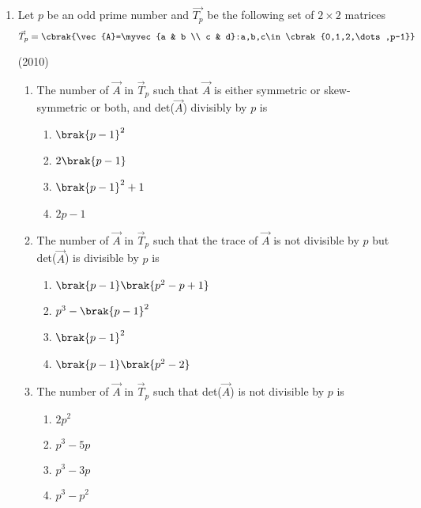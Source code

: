 \begin{enumerate}[label=\thesubsection.\arabic*.,ref=\thesubsection.\theenumi]


	\item Let $p$ be an odd prime number and $\vec{T_p}$ be the following set of $2\times2$ matrices 
	$$\vec{T}_p=\cbrak{\vec{A}=\myvec{a & b \\ c & d}:a,b,c\in\cbrak{0,1,2,\dots,p-1}}$$

			\hfill(2010)
	\begin{enumerate}
		\item The number of $\vec{A}$ in $\vec{T}_p$ such that $\vec{A}$ is either symmetric or skew-symmetric or both, and det($\vec{A}$) divisibly by $p$ is
\begin{multicols}{4}
			\begin{enumerate}
				\item $\brak{p-1}^2$
				\item $2\brak{p-1}$
				\item $\brak{p-1}^2+1$
				\item $2p-1$
			\end{enumerate}
\end{multicols}


		\item The number of $\vec{A}$ in $\vec{T}_p$ such that the trace of $\vec{A}$ is not divisible by $p$ but det($\vec{A}$) is divisible by $p$ is

\begin{multicols}{4}
			\begin{enumerate}
				\item $\brak{p-1}\brak{p^2-p+1}$
				\item $p^3-\brak{p-1}^2$
				\item $\brak{p-1}^2$
				\item $\brak{p-1}\brak{p^2-2}$
			\end{enumerate}
\end{multicols}
%
		\item The number of $\vec{A}$ in $\vec{T}_p$ such that det($\vec{A}$) is not divisible by $p$ is 
\begin{multicols}{4}
			\begin{enumerate}
				\item $2p^2$
				\item $p^3-5p$
				\item $p^3-3p$
				\item $p^3-p^2$
			\end{enumerate}
\end{multicols}


\end{enumerate}
\end{enumerate}
